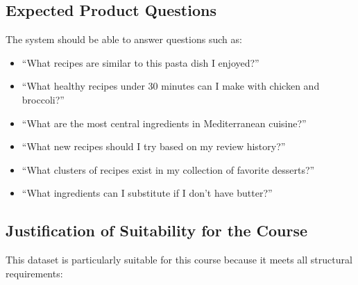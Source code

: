 \documentclass[11pt,a4paper]{article}
\begin{document}
\subsection{Expected Product Questions}

The system should be able to answer questions such as:

\begin{itemize}
    \item ``What recipes are similar to this pasta dish I enjoyed?''
    \item ``What healthy recipes under 30 minutes can I make with chicken and broccoli?''
    \item ``What are the most central ingredients in Mediterranean cuisine?''
    \item ``What new recipes should I try based on my review history?''
    \item ``What clusters of recipes exist in my collection of favorite desserts?''
    \item ``What ingredients can I substitute if I don't have butter?''
\end{itemize}

\subsection{Justification of Suitability for the Course}

This dataset is particularly suitable for this course because it meets all structural requirements:
\end{document}
